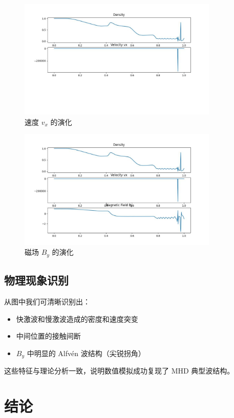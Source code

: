 \documentclass[12pt]{article}
\begin{document}
\begin{figure}[H]
    \centering
    \includegraphics[width=0.85\textwidth]{velocity.jpg}
    \caption{速度 $v_x$ 的演化}
\end{figure}

\begin{figure}[H]
    \centering
    \includegraphics[width=0.85\textwidth]{magnetic_field.jpg}
    \caption{磁场 $B_y$ 的演化}
\end{figure}

\subsection*{物理现象识别}
从图中我们可清晰识别出：

\begin{itemize}
    \item 快激波和慢激波造成的密度和速度突变
    \item 中间位置的接触间断
    \item $B_y$ 中明显的 Alfvén 波结构（尖锐拐角）
\end{itemize}

这些特征与理论分析一致，说明数值模拟成功复现了 MHD 典型波结构。

\section{结论}
\end{document}
